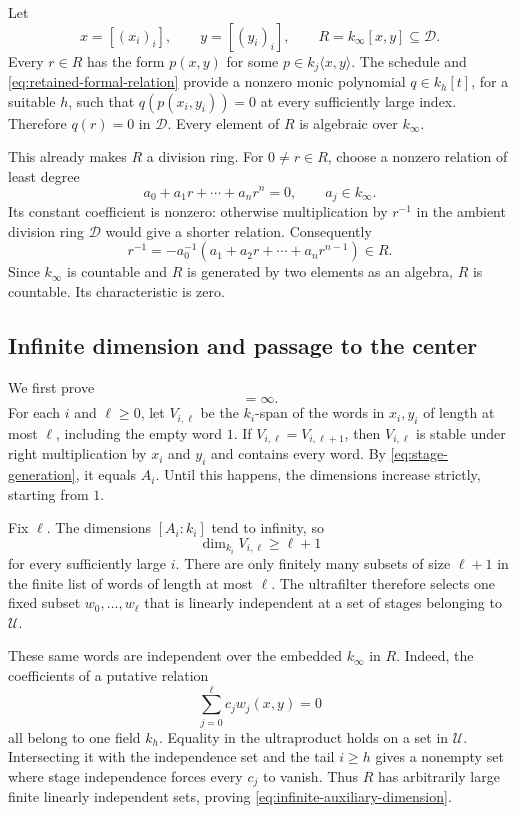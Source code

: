 Let
\[
 x=[(x_i)_i],\qquad y=[(y_i)_i],\qquad
 R=k_\infty[x,y]\subseteq\mathcal D.
\]
Every $r\in R$ has the form $p(x,y)$ for some
$p\in k_j\langle x,y\rangle$.  The schedule and
\eqref{eq:retained-formal-relation} provide a nonzero monic polynomial
$q\in k_h[t]$, for a suitable $h$, such that
$q(p(x_i,y_i))=0$ at every sufficiently large index.  Therefore
$q(r)=0$ in $\mathcal D$.  Every element of $R$ is algebraic over
$k_\infty$.

This already makes $R$ a division ring.  For $0\ne r\in R$, choose a
nonzero relation of least degree
\[
 a_0+a_1r+\cdots+a_nr^n=0,
 \qquad a_j\in k_\infty.
\]
Its constant coefficient is nonzero: otherwise multiplication by
$r^{-1}$ in the ambient division ring $\mathcal D$ would give a shorter
relation.  Consequently
\[
 r^{-1}=-a_0^{-1}(a_1+a_2r+\cdots+a_nr^{n-1})\in R.
\]
Since $k_\infty$ is countable and $R$ is generated by two elements as an
algebra, $R$ is countable.  Its characteristic is zero.

\subsection{Infinite dimension and passage to the center}

We first prove
\begin{equation}
 [R:k_\infty]=\infty.
 \label{eq:infinite-auxiliary-dimension}
\end{equation}
For each $i$ and $\ell\geq0$, let $V_{i,\ell}$ be the $k_i$-span of the
words in $x_i,y_i$ of length at most $\ell$, including the empty word
$1$.  If $V_{i,\ell}=V_{i,\ell+1}$, then $V_{i,\ell}$ is stable under
right multiplication by $x_i$ and $y_i$ and contains every word.
By \eqref{eq:stage-generation}, it equals $A_i$.  Until this happens,
the dimensions increase strictly, starting from $1$.

Fix $\ell$.  The dimensions $[A_i:k_i]$ tend to infinity, so
\[
 \dim_{k_i}V_{i,\ell}\geq\ell+1
\]
for every sufficiently large $i$.  There are only finitely many
subsets of size $\ell+1$ in the finite list of words of length at most
$\ell$.  The ultrafilter therefore selects one fixed subset
$w_0,\ldots,w_\ell$ that is linearly independent at a set of stages
belonging to $\mathcal U$.

These same words are independent over the embedded $k_\infty$ in $R$.
Indeed, the coefficients of a putative relation
\[
 \sum_{j=0}^{\ell} c_j w_j(x,y)=0
\]
all belong to one field $k_h$.  Equality in the ultraproduct holds on
a set in $\mathcal U$.  Intersecting it with the independence set and
the tail $i\geq h$ gives a nonempty set where stage independence
forces every $c_j$ to vanish.  Thus $R$ has arbitrarily large finite
linearly independent sets, proving
\eqref{eq:infinite-auxiliary-dimension}.

